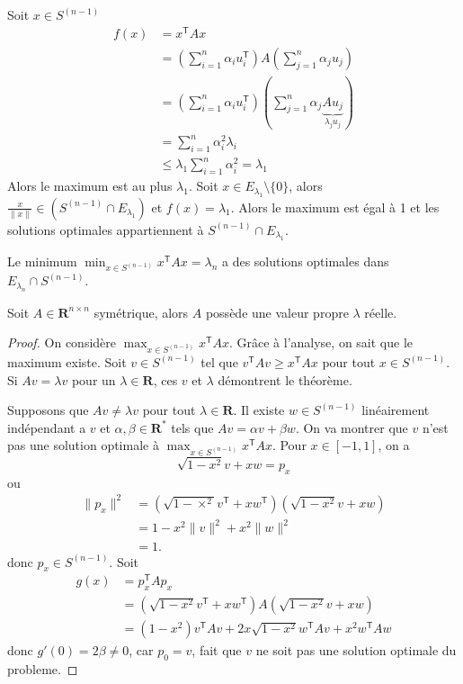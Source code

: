 Soit $x \in S^{(n-1)}$ 
\begin{align*}
f(x) & =x^{\mathsf{T}}Ax \\
 & =\left( \sum_{i=1}^{n} \alpha _{i}u_{i}^{\mathsf{T}} \right)A\left( \sum_{j=1}^{n} \alpha _{j} u_{j}\right) \\
 & =\left( \sum_{i=1}^{n} \alpha _{i}u_{i}^{\mathsf{T}} \right)\left( \sum_{j=1}^{n} \alpha _{j}\underbrace{ Au_{j} }_{ \lambda _{j}u_{j} } \right) \\
 & =\sum_{i=1}^{n}\alpha _{i}^{2}\lambda _{i}  \\
 & \le \lambda_{1} \sum_{i=1}^{n} \alpha _{i}^{2} =\lambda_{1}
\end{align*}
Alors le maximum est au plus $\lambda_{1}$. Soit $x \in E_{\lambda_{1}}\setminus \{ 0 \}$, alors $\frac{x}{\lVert x \rVert}\in(S^{(n-1)}\cap E_{\lambda _{1}})$ et $f(x)=\lambda_{1}$. Alors le maximum est égal à 1 et les solutions optimales appartiennent à $S^{(n-1)}\cap E_{\lambda_{1}}$.
\begin{remark}
Le minimum $\min_{x \in S^{(n-1)}}x^{\mathsf{T}}Ax=\lambda _{n}$ a des solutions optimales dans $E_{\lambda _{n}}\cap S^{(n-1)}$.
\end{remark}
\begin{theorem}
Soit $A\in \mathbf{R}^{n\times n}$ symétrique, alors $A$ possède une valeur propre $\lambda$ réelle.
\end{theorem}
\begin{proof}
On considère $\max_{x \in S^{(n-1)}}x^{\mathsf{T}}Ax$. Grâce à l'analyse, on sait que le maximum existe. Soit $v\in S^{(n-1)}$ tel que $v^{\mathsf{T}}Av\ge x^{\mathsf{T}}Ax$ pour tout $x \in S^{(n-1)}$. Si $Av=\lambda v$ pour un $\lambda \in \mathbf{R}$, ces $v$ et $\lambda$ démontrent le théorème.

Supposons que $Av\neq\lambda v$ pour tout $\lambda \in \mathbf{R}$. Il existe $w\in S^{(n-1)}$ linéairement indépendant a $v$ et $\alpha,\beta \in \mathbf{R}^{*}$ tels que $Av=\alpha v+\beta w$. On va montrer que $v$ n'est pas une solution optimale à $\max_{x \in S^{(n-1)}}x^{\mathsf{T}}Ax$. Pour $x \in[-1,1]$, on a 
$$
\sqrt{ 1-x^{2} }v+x w=p_{x}
$$
ou
\begin{align*}
\lVert p_{x} \rVert ^{2} & =(\sqrt{ 1-\times^{2} }v^{\mathsf{T}}+xw^{\mathsf{T}})(\sqrt{ 1-x^{2} }v+xw) \\
 & =1-x^{2}\lVert v \rVert ^{2} +x^{2}\lVert w \rVert ^{2} \\
 & =1.
\end{align*}
donc $p_{x}\in S^{(n-1)}$. Soit
\begin{align*}
g(x) & =p_{x}^{\mathsf{T}}Ap_{x} \\
 & =(\sqrt{ 1-x^{2} }v^{\mathsf{T}}+xw^{\mathsf{T}})A(\sqrt{ 1-x^{2} }v+xw) \\
 & = (1-x^{2})v^{\mathsf{T}}Av +2x\sqrt{ 1-x^{2} }w^{\mathsf{T}}Av+x^{2}w^{\mathsf{T}}Aw
\end{align*}
donc $g'(0)=2\beta\neq0$, car $p_{0}=v$, fait que $v$ ne soit pas une solution optimale du probleme.
\end{proof}

